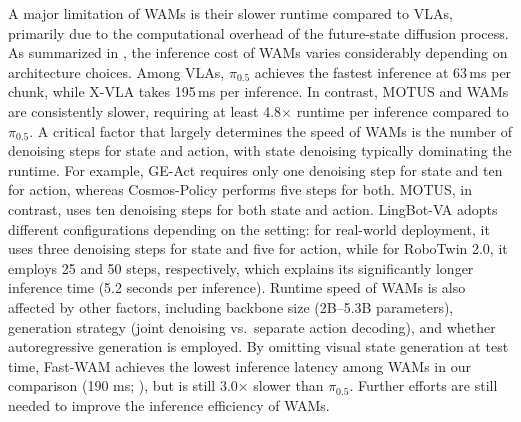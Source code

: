 \documentclass{article}
\begin{document}
A major limitation of WAMs is their slower runtime compared to VLAs, primarily due to the computational overhead of the future-state diffusion process. As summarized in , the inference cost of WAMs varies considerably depending on architecture choices. Among VLAs, $\pi_{0.5}$ achieves the fastest inference at 63\,ms per chunk, while X-VLA takes 195\,ms per inference. In contrast, MOTUS and WAMs are consistently slower, requiring at least 4.8$\times$ runtime per inference compared to $\pi_{0.5}$.
A critical factor that largely determines the speed of WAMs is the number of denoising steps for state and action, with state denoising typically dominating the runtime. For example, GE-Act requires only one denoising step for state and ten for action, whereas Cosmos-Policy performs five steps for both. MOTUS, in contrast, uses ten denoising steps for both state and action. LingBot-VA adopts different configurations depending on the setting: for real-world deployment, it uses three denoising steps for state and five for action, while for RoboTwin 2.0, it employs 25 and 50 steps, respectively, which explains its significantly longer inference time (5.2 seconds per inference). Runtime speed of WAMs is also affected by other factors, including backbone size (2B--5.3B parameters), generation strategy (joint denoising vs.\ separate action decoding), and whether autoregressive generation is employed. By omitting visual state generation at test time, Fast-WAM achieves the lowest inference latency among WAMs in our comparison (190 ms; ), but is still 3.0$\times$ slower than $\pi_{0.5}$. Further efforts are still needed to improve the inference efficiency of WAMs.


\end{document}
